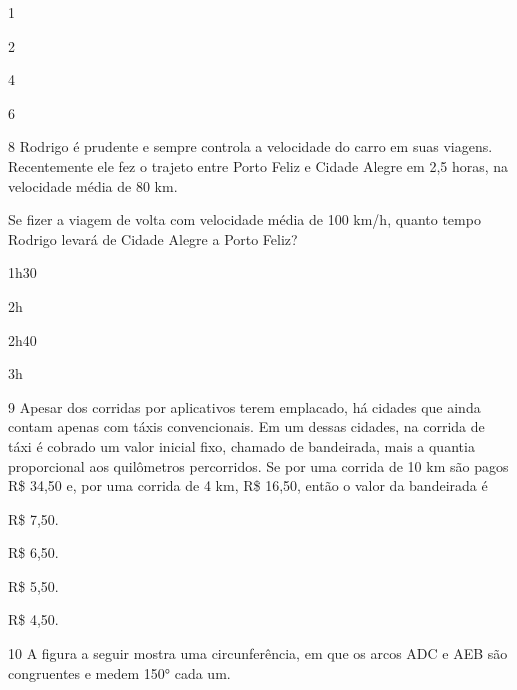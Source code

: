 \begin{escolha}

  \item 1

  \item 2

  \item 4

  \item 6

\end{escolha}

\num{8} Rodrigo é prudente e sempre controla a velocidade do carro em suas
viagens. Recentemente ele fez o trajeto entre Porto Feliz e Cidade Alegre em 
2,5 horas, na  velocidade média de 80 km.

Se fizer a viagem de volta com velocidade média de 100 km/h, quanto tempo 
Rodrigo levará de Cidade Alegre a Porto Feliz?  

\begin{escolha}

  \item 1h30

  \item 2h 
  
  \item 2h40
  
  \item 3h

\end{escolha}

\num{9} Apesar dos corridas por aplicativos terem emplacado, há cidades que ainda
contam apenas com táxis convencionais. Em um dessas cidades, na corrida de 
táxi é cobrado um valor inicial fixo, chamado de bandeirada, mais a quantia
proporcional aos quilômetros percorridos. Se por uma corrida de 10 km são pagos
R\$ 34,50 e, por uma corrida de 4 km, R\$ 16,50, então o valor da bandeirada é

\begin{escolha}

  \item R\$ 7,50.

  \item R\$ 6,50.

  \item R\$ 5,50.

  \item R\$ 4,50.
\end{escolha}

\num{10} A figura a seguir mostra uma circunferência, em que os arcos ADC e
AEB são congruentes e medem 150° cada um.

